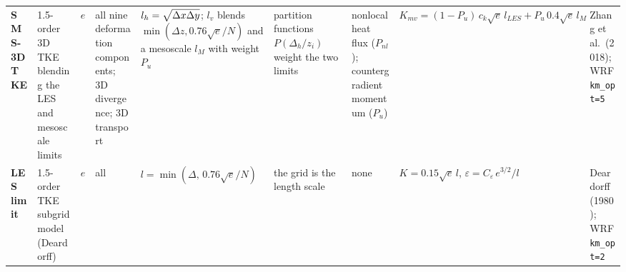 \begin{tabularx}{\linewidth}{@{}L{2.0cm} Y Y Y Y Y Y >{\raggedright\arraybackslash}p{5.0cm} L{2.6cm}@{}}
\textbf{SMS-3DTKE} & 1.5-order 3D TKE blending the LES and mesoscale limits & $e$ &
all nine deformation components; 3D divergence; 3D transport &
$l_h = \sqrt{\Delta x\Delta y}$; $l_v$ blends $\min(\Delta z, 0.76\sqrt{e}/N)$ and a mesoscale $l_M$ with weight $P_u$ &
partition functions $P(\Delta_h/z_i)$ weight the two limits &
nonlocal heat flux ($P_{nl}$); countergradient momentum ($P_u$) &
$K_{mv} = (1 - P_u)\, c_k \sqrt{e}\, l_{LES} + P_u\, 0.4\sqrt{e}\, l_{M}$ &
Zhang et al.\ (2018); WRF \texttt{km\_opt=5} \\
\textbf{LES limit} & 1.5-order TKE subgrid model (Deardorff) & $e$ & all &
$l = \min(\Delta,\, 0.76\sqrt{e}/N)$ & the grid is the length scale & none &
$K = 0.15\sqrt{e}\, l$, \quad $\varepsilon = C_\varepsilon\, e^{3/2}/l$ &
Deardorff (1980); WRF \texttt{km\_opt=2} \\
\bottomrule
\end{tabularx}
\landscapeclose
